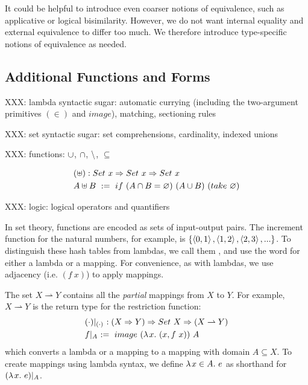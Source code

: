 \documentclass[preprint]{sigplanconf}
\newcommand{\restrict}[1]{\lvert_{#1}}
\newcommand{\pto}{\rightharpoonup}
\begin{document}
It could be helpful to introduce even coarser notions of equivalence, such as applicative or logical bisimilarity.
However, we do not want internal equality and external equivalence to differ too much.
We therefore introduce type-specific notions of equivalence as needed.

\subsection{Additional Functions and Forms}

XXX: lambda syntactic sugar: automatic currying (including the two-argument primitives $(\in)$ and $image$), matching, sectioning rules

XXX: set syntactic sugar: set comprehensions, cardinality, indexed unions

XXX: functions: $\cup$, $\cap$, $\backslash$, $\subseteq$

\begin{equation}
\begin{aligned}
	&(\uplus) : Set~x \Rightarrow Set~x \Rightarrow Set~x \\
	&A \uplus B \ := \ if~(A \cap B = \varnothing)~(A \cup B)~(take~\varnothing)
\end{aligned}
\end{equation}

XXX: logic: logical operators and quantifiers

In set theory, functions are encoded as sets of input-output pairs.
The increment function for the natural numbers, for example, is $\{{\left\langle{0,1}\right\rangle,\left\langle{1,2}\right\rangle,\left\langle{2,3}\right\rangle,...}\}$.
To distinguish these hash tables from lambdas, we call them , and use the word  for either a lambda or a mapping.
For convenience, as with lambdas, we use adjacency (i.e. $(f~x)$) to apply mappings.

The set $X \pto Y$ contains all the \emph{partial} mappings from $X$ to $Y$.
For example, $X \pto Y$ is the return type for the restriction function:
\begin{equation}
\begin{aligned}
	&(\cdot)\restrict{(\cdot)}\ : (X \tto Y) \tto Set~X \tto (X \pto Y) \\
	&f\restrict{A} \ := \ image~(\fun{x}{(x, f~x)})~A
\end{aligned}
\end{equation}
which converts a lambda or a mapping to a mapping with domain $A \subseteq X$.
To create mappings using lambda syntax, we define $\lambda\mspace{2mu}{x \in A}\ldotp\,{e}$ as shorthand for $(\fun{x}{e})\restrict{A}$.
\end{document}
